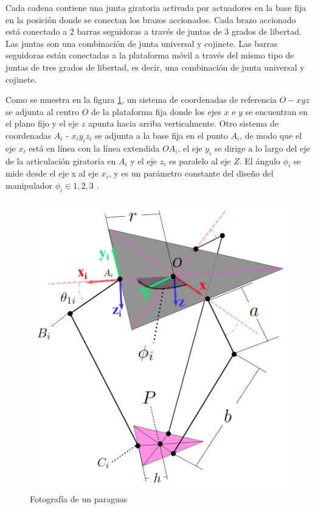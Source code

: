         \newpage
        
     Cada cadena contiene una junta giratoria activada por actuadores en la base fija en la posición donde se conectan los brazos accionados. Cada brazo accionado está conectado a 2 barras seguidoras a través de juntas de 3 grados de libertad. Las juntas son una combinación de junta universal y cojinete.  Las barras seguidoras están conectadas a la plataforma móvil a través del mismo tipo de juntas de tres grados de libertad, es decir, una combinación de junta universal y cojinete.

      

        Como se muestra en la figura \ref{f:Cap4_Metodo_A_Modelacion_Cinematica_Posicion_71}, un sistema de coordenadas de referencia $O-xyz$ se adjunta al centro $O$ de la plataforma fija donde los ejes $x$ e $y$ se encuentran en el plano fijo y el eje $z$ apunta hacia arriba verticalmente.
        Otro sistema de coordenadas $A_i$ -  $x_iy_iz_i$  se adjunta a la base fija en el punto $A_i$, de modo que el eje $x_i$ está en línea con la línea extendida $OA_i$, el eje $y_i$ se dirige a lo largo del eje de la articulación giratoria en $A_i$ y el eje $z_i$ es paralelo al eje $Z$. 
        El ángulo $\phi_i$ se mide desde el eje x al eje $x_i$, y es un parámetro constante del diseño del manipulador $\phi_i ∈{1,2,3}$ .  
    
    


        \begin{figure}[htb]
             \centering
             \includegraphics[width=0.8\linewidth]{Main/Chapter4/Images4/DIBUJO19.jpg}
              \caption{Fotografía de un paraguas}
              \label{f:Cap4_Metodo_A_Modelacion_Cinematica_Posicion_71}
        \end{figure}
        
